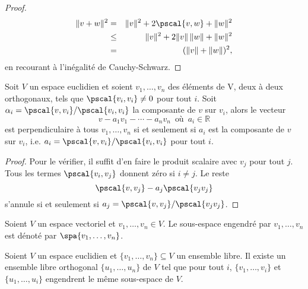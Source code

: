 \begin{proof}
  \begin{eqnarray*}
    \|v+w\|^2 & =     & \|v\|^2 + 2 \pscal{v,w} + \|w\|^2 \\
              & \leq & \|v\|^2 + 2 \|v\|\,\|w\| + \|w\|^2 \\
              & = & (\|v\| + \|w\|)^2,
  \end{eqnarray*}
en recourant à l'inégalité de Cauchy-Schwarz. 
\end{proof}


\begin{lemma}
  \label{lem:2}
  Soit $V$ un espace euclidien  et 
  soient $v_1,\dots,v_n$ des éléments de V, deux à deux orthogonaux, tels que $\pscal{v_i,v_i}\neq 0$ pour tout $i$. Soit $\alpha_i = \pscal{v,v_i}/\pscal{v_i,v_i}$ la composante de $v$ sur $v_i$, alors le vecteur 
\begin{displaymath}
  v - a_1v_1- \cdots - a_n v_n\, \text{ où  }\, a_i \in ℝ 
\end{displaymath}
est perpendiculaire à tous $v_1,\dots,v_n$ si et seulement si $a_i$ est la composante de $v$ sur $v_i$, i.e. $a_i=  \pscal{v,v_i}/ \pscal{v_i,v_i}$ pour tout $i$. 
\end{lemma}

\begin{proof}
  Pour le vérifier, il suffit d'en faire le produit scalaire avec $v_j$ pour tout $j$. Tous les termes $\pscal{v_i,v_j}$ donnent zéro si $i\neq j$. Le reste
  \begin{displaymath}
    \pscal{v,v_j} - a_j\pscal{v_jv_j}
  \end{displaymath}
s'annule si et seulement si $a_j = \pscal{v,v_j}/\pscal{v_jv_j}$. 
\end{proof}



\begin{notation}
  Soient $V$ un espace vectoriel et $v_1,\dots,v_n \in V$. Le sous-espace engendré par $v_1,\dots,v_n$ est dénoté par  $\spa\{v_1,\dots,v_n\}$. 
\end{notation}



\begin{theorem}
  \label{thr:2}
  Soient $V$ un espace euclidien et  $\{v_1,\dots,v_n\} \subseteq V$
  un ensemble libre.  
  Il existe un ensemble libre orthogonal $\{u_1,\dots,u_n\}$
  de $V$
  tel que pour tout $i$, 
  $\{v_1,\dots,v_i\}$
  et $\{u_1,\dots,u_i\}$ engendrent le même sous-espace de $V$.
\end{theorem}


